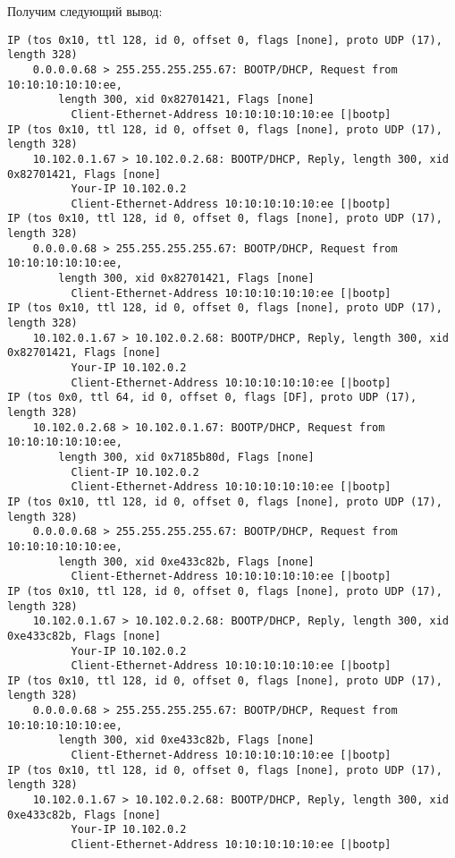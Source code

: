 \documentclass[a4paper,12pt]{article}
\begin{document}
Получим следующий вывод:
\begin{Verbatim}
IP (tos 0x10, ttl 128, id 0, offset 0, flags [none], proto UDP (17), length 328) 
	0.0.0.0.68 > 255.255.255.255.67: BOOTP/DHCP, Request from 10:10:10:10:10:ee, 
		length 300, xid 0x82701421, Flags [none]
          Client-Ethernet-Address 10:10:10:10:10:ee [|bootp]
IP (tos 0x10, ttl 128, id 0, offset 0, flags [none], proto UDP (17), length 328) 
	10.102.0.1.67 > 10.102.0.2.68: BOOTP/DHCP, Reply, length 300, xid 0x82701421, Flags [none]
          Your-IP 10.102.0.2
          Client-Ethernet-Address 10:10:10:10:10:ee [|bootp]
IP (tos 0x10, ttl 128, id 0, offset 0, flags [none], proto UDP (17), length 328) 
	0.0.0.0.68 > 255.255.255.255.67: BOOTP/DHCP, Request from 10:10:10:10:10:ee, 
		length 300, xid 0x82701421, Flags [none]
          Client-Ethernet-Address 10:10:10:10:10:ee [|bootp]
IP (tos 0x10, ttl 128, id 0, offset 0, flags [none], proto UDP (17), length 328) 
	10.102.0.1.67 > 10.102.0.2.68: BOOTP/DHCP, Reply, length 300, xid 0x82701421, Flags [none]
          Your-IP 10.102.0.2
          Client-Ethernet-Address 10:10:10:10:10:ee [|bootp]
IP (tos 0x0, ttl 64, id 0, offset 0, flags [DF], proto UDP (17), length 328) 
	10.102.0.2.68 > 10.102.0.1.67: BOOTP/DHCP, Request from 10:10:10:10:10:ee, 
		length 300, xid 0x7185b80d, Flags [none]
          Client-IP 10.102.0.2
          Client-Ethernet-Address 10:10:10:10:10:ee [|bootp]
IP (tos 0x10, ttl 128, id 0, offset 0, flags [none], proto UDP (17), length 328) 
	0.0.0.0.68 > 255.255.255.255.67: BOOTP/DHCP, Request from 10:10:10:10:10:ee, 
		length 300, xid 0xe433c82b, Flags [none]
          Client-Ethernet-Address 10:10:10:10:10:ee [|bootp]
IP (tos 0x10, ttl 128, id 0, offset 0, flags [none], proto UDP (17), length 328) 
	10.102.0.1.67 > 10.102.0.2.68: BOOTP/DHCP, Reply, length 300, xid 0xe433c82b, Flags [none]
          Your-IP 10.102.0.2
          Client-Ethernet-Address 10:10:10:10:10:ee [|bootp]
IP (tos 0x10, ttl 128, id 0, offset 0, flags [none], proto UDP (17), length 328) 
	0.0.0.0.68 > 255.255.255.255.67: BOOTP/DHCP, Request from 10:10:10:10:10:ee, 
		length 300, xid 0xe433c82b, Flags [none]
          Client-Ethernet-Address 10:10:10:10:10:ee [|bootp]
IP (tos 0x10, ttl 128, id 0, offset 0, flags [none], proto UDP (17), length 328) 
	10.102.0.1.67 > 10.102.0.2.68: BOOTP/DHCP, Reply, length 300, xid 0xe433c82b, Flags [none]
          Your-IP 10.102.0.2
          Client-Ethernet-Address 10:10:10:10:10:ee [|bootp]
\end{Verbatim}
\end{document}
